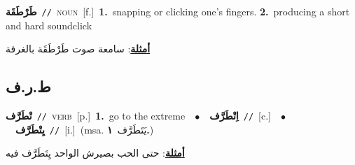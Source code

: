 \documentclass[10pt,a4paper,twoside]{article} %
\begin{document}
\begin{multicols}{2}
{\setlength\topsep{0pt}\textbf{\foreignlanguage{arabic}{طَرْطَقَة}}\ {\color{gray}\texttt{//}\color{black}}\ \textsc{noun}\ [f.]\ \textbf{1.}~snapping or clicking one's fingers.  \textbf{2.}~producing a short and hard soundclick\  \begin{flushright}\color{gray}\foreignlanguage{arabic}{\textbf{\underline{\foreignlanguage{arabic}{أمثلة}}}: سامعة صوت طَرْطَقَة بالغرفة}\end{flushright}\color{black}} \vspace{2mm}

\vspace{-3mm}
\subsection*{\color{blue}\foreignlanguage{arabic}{ط.ر.ف}\color{blue}{}} 

{\setlength\topsep{0pt}\textbf{\foreignlanguage{arabic}{تْطَرَّف}}\ {\color{gray}\texttt{//}\color{black}}\ \textsc{verb}\ [p.]\ \textbf{1.}~go to the extreme\ \ $\bullet$\ \ \setlength\topsep{0pt}\textbf{\foreignlanguage{arabic}{اِتْطَرَّف}}\ {\color{gray}\texttt{//}\color{black}}\ [c.]\ \ $\bullet$\ \ \setlength\topsep{0pt}\textbf{\foreignlanguage{arabic}{يِتْطَرَّف}}\ {\color{gray}\texttt{//}\color{black}}\ [i.]\ \color{gray}(msa. \foreignlanguage{arabic}{يَتَطَرَّف}~\foreignlanguage{arabic}{\textbf{١.}})\color{black}\  \begin{flushright}\color{gray}\foreignlanguage{arabic}{\textbf{\underline{\foreignlanguage{arabic}{أمثلة}}}: حتى الحب بصيرش الواحد يِتَطَرَّف فيه}\end{flushright}\color{black}} \vspace{2mm}


\end{multicols}
\end{document}
